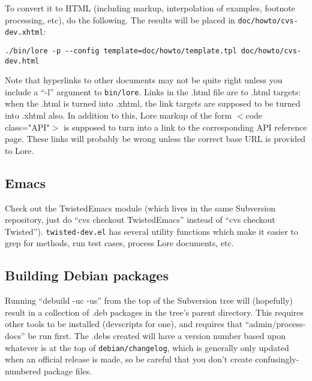 To convert it to HTML (including markup, interpolation of examples, footnote processing, etc), do the following. The results will be placed in \texttt{doc/howto/cvs-dev.\linebreak[1]xhtml}:\begin{verbatim}
./bin/lore -p --config template=doc/howto/template.tpl doc/howto/cvs-dev.html
\end{verbatim}


Note that hyperlinks to other documents may not be quite right unless you include a ``-l'' argument to \texttt{bin/lore}. Links in the .html file are to .html targets: when the .html is turned into .xhtml, the link targets are supposed to be turned into .xhtml also. In addition to this, Lore markup of the form $<$code class="API"$>$ is supposed to turn into a link to the corresponding API reference page. These links will probably be wrong unless the correct base URL is provided to Lore.

\subsection{Emacs}


Check out the TwistedEmacs module (which lives in the same Subversion repository, just do ``cvs checkout TwistedEmacs'' instead of ``cvs checkout Twisted''). \texttt{twisted-dev.\linebreak[1]el} has several utility functions which make it easier to grep for methods, run test cases, process Lore documents, etc.

\subsection{Building Debian packages}


Running ``debuild -uc -us'' from the top of the Subversion tree will (hopefully) result in a collection of .deb packages in the tree's parent directory. This requires other tools to be installed (devscripts for one), and requires that ``admin/process-docs'' be run first. The .debs created will have a version number based upon whatever is at the top of \texttt{debian/changelog}, which is generally only updated when an official release is made, so be careful that you don't create confusingly-numbered package files. 